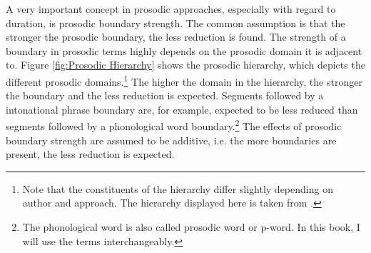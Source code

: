 


A very important concept in prosodic approaches, especially with regard to duration, is prosodic boundary strength. The common assumption is that the stronger the prosodic boundary, the less reduction is found. The strength of a boundary in prosodic terms highly depends on the prosodic domain it is adjacent to.
Figure \ref{fig:Prosodic Hierarchy} shows the prosodic hierarchy, which depicts the different prosodic domains.\footnote{Note that the constituents of the hierarchy differ slightly depending on author and approach. The hierarchy displayed here is taken from \citet[9]{Hall.2001}.} 
The higher the domain in the hierarchy, the stronger the boundary and the less reduction is expected. Segments followed by a intonational phrase boundary are, for example, expected to be less reduced than segments followed by a {phonological word} boundary.\footnote{The phonological word is also called prosodic word or p-word. In this book, I will use the terms interchangeably.}
 The effects of prosodic boundary strength are assumed to be additive, i.e. the more boundaries are present, the less reduction is expected. %


